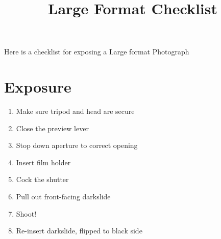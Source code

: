 \documentclass[12pt, letterpaper]{article}
\begin{document}
 \title{\LARGE{Large Format Checklist}}
 \date{}
  
\maketitle

Here is a checklist for exposing a Large format Photograph

\section{Exposure}

\begin{enumerate}

	\item Make sure tripod and head are secure
	\item Close the preview lever
	\item Stop down aperture to correct opening
	\item Insert film holder
	\item Cock the shutter
	\item Pull out front-facing darkslide
	\item Shoot!
	\item Re-insert darkslide, flipped to black side
\end{enumerate}

	

  
  
\end{document}
